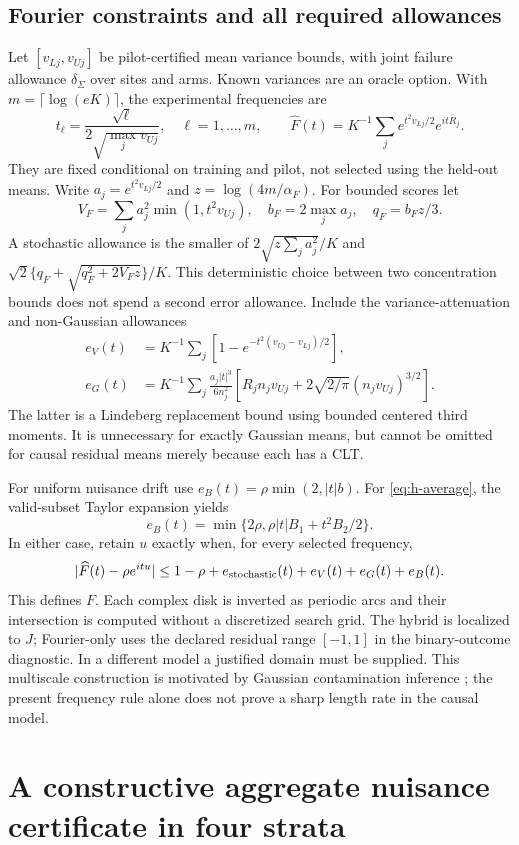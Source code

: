 \subsection{Fourier constraints and all required allowances}

Let $[v_{Lj},v_{Uj}]$ be pilot-certified mean variance bounds, with joint
failure allowance $\delta_\Sigma$ over sites and arms. Known variances are
an oracle option. With $m=\lceil\log(eK)\rceil$, the experimental frequencies are
\[
 t_\ell=\frac{\sqrt\ell}{2\sqrt{\max_jv_{Uj}}},\quad
 \ell=1,\ldots,m,\qquad
 \widehat F(t)=K^{-1}\sum_j e^{t^2v_{Lj}/2}e^{it\bar R_j}.
\]
They are fixed conditional on training and pilot, not selected using the
held-out means. Write $a_j=e^{t^2v_{Lj}/2}$ and
$z=\log(4m/\alpha_F)$. For bounded scores let
\[
 V_F=\sum_ja_j^2\min(1,t^2v_{Uj}),\quad b_F=2\max_ja_j,
 \quad q_F=b_Fz/3.
\]
A stochastic allowance is the smaller of
$2\sqrt{z\sum_ja_j^2}/K$ and
$\sqrt2\{q_F+\sqrt{q_F^2+2V_Fz}\}/K$.
This deterministic choice between two concentration bounds does not spend a
second error allowance. Include the variance-attenuation and non-Gaussian
allowances
\begin{align*}
 e_V(t)&=K^{-1}\sum_j[1-e^{-t^2(v_{Uj}-v_{Lj})/2}],\\
 e_G(t)&=K^{-1}\sum_j\frac{a_j|t|^3}{6n_j^2}
  [R_jn_jv_{Uj}+2\sqrt{2/\pi}(n_jv_{Uj})^{3/2}].
\end{align*}
The latter is a Lindeberg replacement bound using bounded centered third
moments. It is unnecessary for exactly Gaussian means, but cannot be omitted
for causal residual means merely because each has a CLT.

For uniform nuisance drift use $e_B(t)=\rho\min(2,|t|b)$.
For \eqref{eq:h-average}, the valid-subset Taylor expansion yields
\[
 e_B(t)=\min\{2\rho,\rho|t|B_1+t^2B_2/2\}.
\]
In either case, retain $u$ exactly when, for every selected frequency,
\[
 |\widehat F(t)-\rho e^{itu}|
 \le 1-\rho+e_{\rm stochastic}(t)+e_V(t)+e_G(t)+e_B(t).
\]
This defines $F$. Each complex disk is inverted as periodic arcs and their
intersection is computed without a discretized search grid. The hybrid is
localized to $J$; Fourier-only uses the declared residual range $[-1,1]$
in the binary-outcome diagnostic. In a different model a justified domain
must be supplied. This multiscale construction is motivated by Gaussian
contamination inference \citep{wang2026}; the present frequency rule alone
does not prove a sharp length rate in the causal model.

\section{A constructive aggregate nuisance certificate in four strata}

